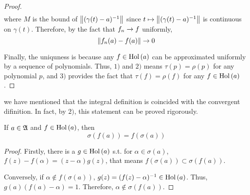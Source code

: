 \documentclass[a4paper,11pt]{report}
\begin{document}
\begin{proof}
\begin{eqnarray*}
	\end{eqnarray*}
	where $M$ is the bound of $\left\lVert(\gamma(t)-a)^{-1}\right\lVert$ since $t \mapsto \left\lVert(\gamma(t)-a)^{-1}\right\lVert$ is continuous on $\gamma(t)$. Therefore, by the fact that $f_n \rightarrow f$ uniformly,
	\begin{equation*}
		\left\lVert f_n(a)-f(a)\right\lVert \rightarrow 0
	\end{equation*}
	\item Finally, the uniquness is because any $f \in \operatorname{Hol}{(a)}$ can be approximated uniformly by a sequence of polynomials. Thus, $1)$ and $2)$ means $\tau(p) = \rho(p)$ for any polynomial $p$, and $3)$ provides the fact that $\tau(f) = \rho(f)$ for any $f \in \operatorname{Hol}{(a)}$.
\end{proof}
\begin{rem}
	we have mentioned that the integral definition is coincided with the convergent difinition. In fact, by $2)$, this statement can be proved rigorously.
\end{rem}

\begin{thm}
	If $a \in \mathfrak{A}$ and $f \in \operatorname{Hol}{(a)}$, then
	\begin{equation*}
		\sigma(f(a)) = f(\sigma(a))
	\end{equation*}
\end{thm}
\begin{proof}
	Firstly, there is a $g \in \operatorname{Hol}{(a)}$ s.t. for $\alpha \in \sigma(a)$, $f(z)-f(\alpha) = (z-\alpha)g(z)$, that means $f(\sigma(a)) \subset \sigma(f(a))$.
	\item Conversely, if $\alpha \notin f(\sigma(a))$, $g(z)=(f(z)-\alpha)^{-1} \in \operatorname{Hol}{(a)}$. Thus, $g(a)(f(a)-\alpha) = 1$. Therefore, $\alpha \notin \sigma(f(a))$.
\end{proof}
\end{document}
